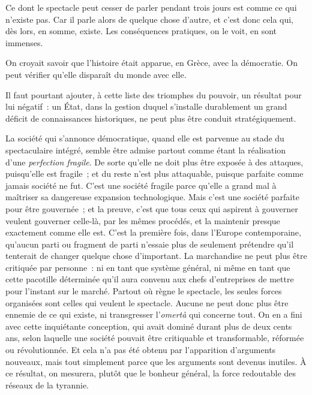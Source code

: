 \documentclass[french,twoside]{book} %
\def\bignobreak{\ifdim\lastskip<\bigskipamount
  \removelastskip\nopagebreak\bigskip\fi}
\newcommand{\labelblock}[1]{\bigbreak{\color{rubric}\noindent\textbf{#1}\par}\bignobreak}
\begin{document}
Ce dont le spectacle peut cesser de parler pendant trois jours est comme ce qui n’existe pas. Car il parle alors de quelque chose d’autre, et c’est donc cela qui, dès lors, en somme, existe. Les conséquences pratiques, on le voit, en sont immenses.\par
On croyait savoir que l’histoire était apparue, en Grèce, avec la démocratie. On peut vérifier qu’elle disparaît du monde avec elle.\par
Il faut pourtant ajouter, à cette liste des triomphes du pouvoir, un résultat pour lui négatif : un État, dans la gestion duquel s’installe durablement un grand déficit de connaissances historiques, ne peut plus être conduit stratégiquement.\par

\labelblock{VIII}

\noindent La société qui s’annonce démocratique, quand elle est parvenue au stade du spectaculaire intégré, semble être admise partout comme étant la réalisation d’une \emph{perfection fragile}. De sorte qu’elle ne doit plus être exposée à des attaques, puisqu’elle est fragile ; et du reste n’est plus attaquable, puisque parfaite comme jamais société ne fut. C’est une société fragile parce qu’elle a grand mal à maîtriser sa dangereuse expansion technologique. Mais c’est une société parfaite pour être gouvernée ; et la preuve, c’est que tous ceux qui aspirent à gouverner veulent gouverner celle-là, par les mêmes procédés, et la maintenir presque exactement comme elle est. C’est la première fois, dans l’Europe contemporaine, qu’aucun parti ou fragment de parti n’essaie plus de seulement prétendre qu’il tenterait de changer quelque chose d’important. La marchandise ne peut plus être critiquée par personne : ni en tant que système général, ni même en tant que cette pacotille déterminée qu’il aura convenu aux chefs d’entreprises de mettre pour l’instant sur le marché. Partout où règne le spectacle, les seules forces organisées sont celles qui veulent le spectacle. Aucune ne peut donc plus être ennemie de ce qui existe, ni transgresser l’\emph{omertà} qui concerne tout. On en a fini avec cette inquiétante conception, qui avait dominé durant plus de deux cents ans, selon laquelle une société pouvait être critiquable et transformable, réformée ou révolutionnée. Et cela n’a pas été obtenu par l’apparition d’arguments nouveaux, mais tout simplement parce que les arguments sont devenus inutiles. À ce résultat, on mesurera, plutôt que le bonheur général, la force redoutable des réseaux de la tyrannie.\par
\end{document}
